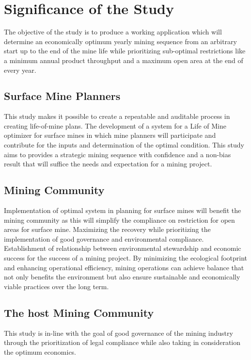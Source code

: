 \documentclass[12pt]{report}
\begin{document}
\section{Significance of the Study}

The objective of the study is to produce a working application which will determine an economically optimum yearly mining sequence from an arbitrary start up to the end of the mine life while prioritizing sub-optimal restrictions like a minimum annual product throughput and a maximum open area at the end of every year.


\subsection{Surface Mine Planners}

This study makes it possible to create a repeatable and auditable process in creating life-of-mine plans.
The development of a system for a Life of Mine optimizer for surface mines in which mine planners will participate and contribute for the inputs and determination of the optimal condition. 
This study aims to provides a strategic mining sequence with confidence and a non-bias result that will suffice the needs and expectation for a mining project.

\subsection{Mining Community}

Implementation of optimal system in planning for surface mines will benefit the mining community as this will simplify the compliance on restriction for open areas for surface mine. 
Maximizing the recovery while prioritizing the implementation of good governance and environmental compliance.
Establishment of relationship between environmental stewardship and economic success for the success of a mining project.
By minimizing the ecological footprint and enhancing operational efficiency, mining operations can achieve balance that not only benefits the environment but also ensure sustainable and economically viable practices over the long term.

\subsection{The host Mining Community}

This study is in-line with the goal of good governance of the mining industry through the prioritization of legal compliance while also taking in consideration the optimum economics.
\end{document}

